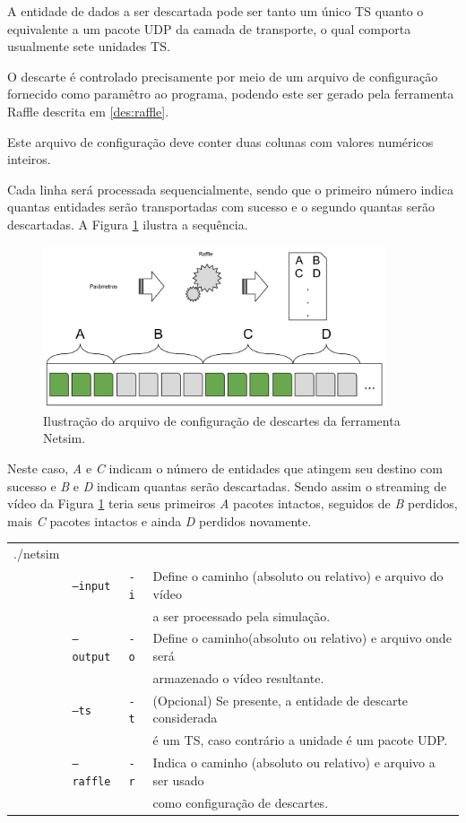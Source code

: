 A entidade de dados a ser descartada pode ser tanto um único TS quanto o equivalente a um pacote UDP da camada de transporte, o qual comporta usualmente sete unidades TS.

O descarte é controlado precisamente por meio de um arquivo de configuração fornecido como paramêtro ao programa, podendo este ser gerado pela ferramenta Raffle descrita em \ref{des:raffle}.

Este arquivo de configuração deve conter duas colunas com valores numéricos inteiros. 

Cada linha será processada sequencialmente, sendo que o primeiro número indica quantas entidades serão transportadas com sucesso e o segundo quantas serão descartadas. 
A Figura \ref{fig:netsim} ilustra a sequência.

\begin{figure}[!htb]
	\centering
	\includegraphics[width=0.9\textwidth]{./imgs/netsim.png}
	\caption{Ilustração do arquivo de configuração de descartes da ferramenta Netsim.}
	\label{fig:netsim}
\end{figure}

Neste caso, \emph{A} e \emph{C} indicam o número de entidades que atingem seu destino com sucesso e \emph{B} e \emph{D} indicam quantas serão descartadas. 
Sendo assim o streaming de vídeo da Figura \ref{fig:netsim}  teria seus primeiros \emph{A} pacotes intactos, seguidos de \emph{B} perdidos, mais \emph{C} pacotes intactos e ainda \emph{D} perdidos novamente.

\begin{table}[!h]
	\begin{tabular}{llll}
	./netsim & & \\
	& \texttt{--input} & \texttt{-i} & Define o caminho (absoluto ou relativo) e arquivo do vídeo \\ 
	& & & a ser processado pela simulação. \\
	& \texttt{--output} & \texttt{-o} & Define o caminho(absoluto ou relativo) e arquivo onde será \\ 
	& & & armazenado o vídeo resultante. \\
	& \texttt{--ts} & \texttt{-t} & (Opcional) Se presente, a entidade de descarte considerada \\
	& & & é um TS, caso contrário a unidade é um pacote UDP. \\
	& \texttt{--raffle} & \texttt{-r} & Indica o caminho (absoluto ou relativo) e arquivo a ser usado \\ 
	& & & como configuração de descartes. \\
	\end{tabular}
\end{table}


